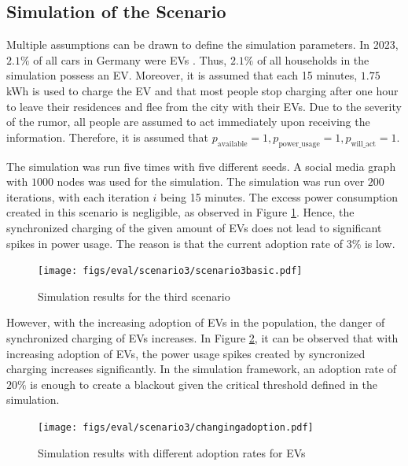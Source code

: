 \subsection{Simulation of the Scenario}

Multiple assumptions can be drawn to define the simulation parameters. 
In 2023, $2.1\%$ of all cars in Germany were 
EVs \cite{evadoption}. Thus, $2.1\%$ of all households in the simulation
possess an EV. Moreover, it is assumed that 
each 15 minutes, $1.75$kWh is used to charge the EV 
and that most people stop charging after one hour
to leave their residences and flee from the city with their EVs.
Due to the severity of the rumor,
all people are assumed to act immediately upon 
receiving the information. Therefore, it is assumed 
that $p_{\mathrm{available}}=1, 
p_{\mathrm{power\_usage}}=1, p_{\mathrm{will\_act}}=1$.


The simulation was run five times with five different seeds. 
A social media graph with $1000$ nodes was used for the simulation. 
The simulation was run over $200$ iterations, with each
iteration $i$ being 15 minutes.
The excess power consumption created in this scenario is negligible, 
as observed in Figure \ref{thirdscenarioresults}.  Hence, the 
synchronized charging of the given amount of EVs does not
lead to significant spikes in power usage.
The reason is that the current adoption rate of $3\%$ is low.

\begin{figure}[!ht]
    \center
    \texttt{[image: figs/eval/scenario3/scenario3basic.pdf]}
    \caption{Simulation results for the third scenario}
    \label{thirdscenarioresults}
\end{figure}

However, with the increasing adoption of EVs in the 
population, the danger of synchronized charging 
of EVs increases. In Figure \ref{thirdscenarioresultsdiffadoption},
it can be observed that with increasing adoption of EVs,
the power usage spikes created by syncronized charging 
increases significantly. In the simulation framework,
an adoption rate of $20\%$ is enough to create a 
blackout given the critical threshold 
defined in the simulation.

\begin{figure}[!ht]
    \center
    \texttt{[image: figs/eval/scenario3/changingadoption.pdf]}
    \caption{Simulation results with different adoption rates for EVs}
    \label{thirdscenarioresultsdiffadoption}
\end{figure}

